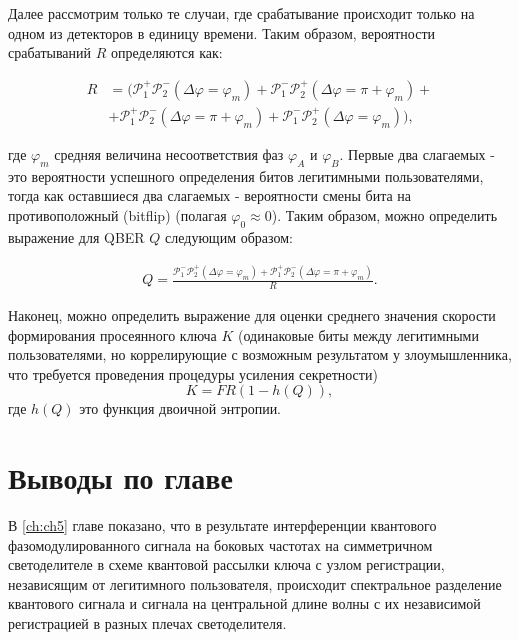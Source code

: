 Далее рассмотрим только те случаи, где срабатывание происходит только на одном из детекторов в единицу времени.  Таким образом, вероятности срабатываний $R$ определяются как:

\begin{align}
    R&=\Big(\mathcal{P}_{1}^{+}\mathcal{P}_{2}^{-}(\Delta\varphi=\varphi_m)+\mathcal{P}_{1}^{-}\mathcal{P}_{2}^{+}(\Delta\varphi=\pi+\varphi_m)+ \nonumber \\
    &+\mathcal{P}_{1}^{+}\mathcal{P}_{2}^{-}(\Delta\varphi=\pi+\varphi_m)+\mathcal{P}_{1}^{-}\mathcal{P}_{2}^{+}(\Delta\varphi=\varphi_m)\Big),
\end{align}


где $\varphi_m$ средняя величина несоответствия фаз $\varphi_A$ и $\varphi_B$. Первые два слагаемых - это вероятности успешного определения битов легитимными пользователями, тогда как оставшиеся два слагаемых - вероятности смены бита на противоположный (bitflip) (полагая $\varphi_0 \approx 0$). Таким образом, можно определить выражение для QBER $Q$ следующим образом:

\begin{align}
    Q=\frac{\mathcal{P}_{1}^{-}\mathcal{P}_{2}^{+}(\Delta\varphi=\varphi_m)+\mathcal{P}_{1}^{+}\mathcal{P}_{2}^{-}(\Delta\varphi=\pi+\varphi_m)}{R}.
\end{align}


Наконец, можно определить выражение для оценки среднего значения скорости формирования просеянного ключа $K$ (одинаковые биты между легитимными пользователями, но коррелирующие с возможным результатом у злоумышленника, что требуется проведения процедуры усиления секретности)
\begin{equation}
    K=FR(1-h(Q)),
\end{equation}
где $h(Q)$ это функция двоичной энтропии. 

\pagebreak

\section{Выводы по главе} \label{ch:ch5/sec9}


В \ref{ch:ch5} главе показано, что в результате интерференции квантового фазомодулированного сигнала на боковых частотах на симметричном светоделителе в схеме квантовой рассылки ключа с узлом регистрации, независящим от легитимного пользователя, происходит спектральное разделение квантового сигнала и сигнала на центральной длине волны с их независимой регистрацией в разных плечах светоделителя. 

\pagebreak
